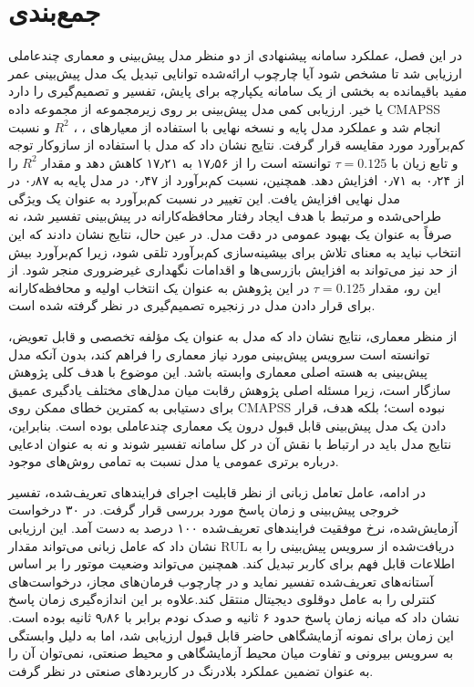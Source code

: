 \documentclass[a4paper,fleqn]{report}
\begin{document}
\section{جمع‌بندی}
\label{sec:chapter5-summary}
در این فصل، عملکرد سامانه پیشنهادی از دو منظر مدل پیش‌بینی و معماری چندعاملی ارزیابی شد تا مشخص شود آیا چارچوب ارائه‌شده توانایی تبدیل یک مدل پیش‌بینی عمر مفید باقیمانده به بخشی از یک سامانه یکپارچه برای پایش، تفسیر و تصمیم‌گیری را دارد یا خیر. ارزیابی کمی مدل پیش‌بینی بر روی زیرمجموعه  از مجموعه داده \gls{CMAPSS} انجام شد و عملکرد مدل پایه و نسخه نهایی  با استفاده از معیارهای ، ، $R^2$ و نسبت کم‌برآورد مورد مقایسه قرار گرفت. نتایج نشان داد که مدل  با استفاده از سازوکار توجه و تابع زیان  با $\tau=0.125$ توانسته است  را از ۱۷٫۵۶ به ۱۷٫۲۱ کاهش دهد و مقدار $R^2$ را از ۰٫۲۴ به ۰٫۷۱ افزایش دهد. همچنین، نسبت کم‌برآورد از ۰٫۴۷ در مدل پایه به ۰٫۸۷ در مدل نهایی افزایش یافت. این تغییر در نسبت کم‌برآورد به عنوان یک ویژگی طراحی‌شده و مرتبط با هدف ایجاد رفتار محافظه‌کارانه در پیش‌بینی تفسیر شد، نه صرفاً به عنوان یک بهبود عمومی در دقت مدل. در عین حال، نتایج نشان دادند که این انتخاب نباید به معنای تلاش برای بیشینه‌سازی کم‌برآورد تلقی شود، زیرا کم‌برآورد بیش از حد نیز می‌تواند به افزایش بازرسی‌ها و اقدامات نگهداری غیرضروری منجر شود. از این رو، مقدار $\tau=0.125$ در این پژوهش به عنوان یک انتخاب اولیه و محافظه‌کارانه برای قرار دادن مدل در زنجیره تصمیم‌گیری در نظر گرفته شده است.

از منظر معماری، نتایج نشان داد که مدل  به عنوان یک مؤلفه تخصصی و قابل تعویض، توانسته است سرویس پیش‌بینی مورد نیاز معماری را فراهم کند، بدون آنکه مدل پیش‌بینی به هسته اصلی معماری وابسته باشد. این موضوع با هدف کلی پژوهش سازگار است، زیرا مسئله اصلی پژوهش رقابت میان مدل‌های مختلف یادگیری عمیق برای دستیابی به کمترین خطای ممکن روی \gls{CMAPSS} نبوده است؛ بلکه هدف، قرار دادن یک مدل پیش‌بینی قابل قبول درون یک معماری چندعاملی بوده است. بنابراین، نتایج مدل باید در ارتباط با نقش آن در کل سامانه تفسیر شوند و نه به عنوان ادعایی درباره برتری عمومی  یا مدل  نسبت به تمامی روش‌های موجود.

در ادامه، عامل تعامل زبانی از نظر قابلیت اجرای فرایندهای تعریف‌شده، تفسیر خروجی پیش‌بینی و زمان پاسخ مورد بررسی قرار گرفت. در ۳۰ درخواست آزمایش‌شده، نرخ موفقیت فرایندهای تعریف‌شده ۱۰۰ درصد به دست آمد. این ارزیابی نشان داد که عامل زبانی می‌تواند مقدار \gls{RUL} دریافت‌شده از سرویس پیش‌بینی را به اطلاعات قابل فهم برای کاربر تبدیل کند. همچنین می‌تواند وضعیت موتور را بر اساس آستانه‌های تعریف‌شده تفسیر نماید و در چارچوب فرمان‌های مجاز، درخواست‌های کنترلی را به عامل دوقلوی دیجیتال منتقل کند.علاوه‌ بر این اندازه‌گیری زمان پاسخ نشان داد که میانه زمان پاسخ حدود ۶ ثانیه و صدک نودم برابر با ۹٫۸۶ ثانیه بوده است. این زمان برای نمونه آزمایشگاهی حاضر قابل قبول ارزیابی شد، اما به دلیل وابستگی به سرویس بیرونی و تفاوت میان محیط آزمایشگاهی و محیط صنعتی، نمی‌توان آن را به عنوان تضمین عملکرد بلادرنگ در کاربردهای صنعتی در نظر گرفت.
\end{document}
